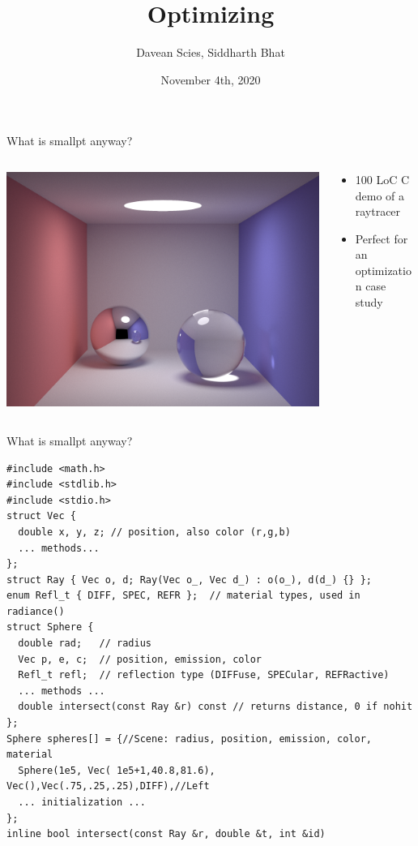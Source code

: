 \documentclass[8pt]{beamer}
\author{Davean Scies, Siddharth Bhat}
\date{November 4th, 2020}
\institute{Haskell Exchange}
\title{Optimizing \smallpt}
\begin{document}
\maketitle

\begin{frame}[fragile]{What is smallpt anyway?}
\pause
\begin{columns}
\begin{column}{0.48\textwidth}
\includegraphics[height=0.8\textwidth]{./smallpt-render.png}
\end{column}
\begin{column}{0.48\textwidth}
\pause
\begin{itemize}
\item 100 LoC C demo of a raytracer \pause
\item Perfect for an optimization case study
\end{itemize}
\end{column}
\end{columns}
\end{frame}

\begin{frame}[fragile]{What is smallpt anyway?}
\begin{verbatim}
#include <math.h>
#include <stdlib.h>
#include <stdio.h>
struct Vec {      
  double x, y, z; // position, also color (r,g,b) 
  ... methods...
}; 
struct Ray { Vec o, d; Ray(Vec o_, Vec d_) : o(o_), d(d_) {} }; 
enum Refl_t { DIFF, SPEC, REFR };  // material types, used in radiance() 
struct Sphere { 
  double rad;   // radius 
  Vec p, e, c;  // position, emission, color 
  Refl_t refl;  // reflection type (DIFFuse, SPECular, REFRactive) 
  ... methods ...
  double intersect(const Ray &r) const // returns distance, 0 if nohit 
}; 
Sphere spheres[] = {//Scene: radius, position, emission, color, material 
  Sphere(1e5, Vec( 1e5+1,40.8,81.6), Vec(),Vec(.75,.25,.25),DIFF),//Left 
  ... initialization ...
}; 
inline bool intersect(const Ray &r, double &t, int &id) 
\end{verbatim}
\end{frame}
\end{document}
